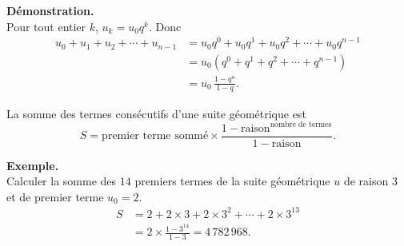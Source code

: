\documentclass[11pt]{article}
\newenvironment{exemple}{\par\smallskip\noindent\textbf{Exemple. \\}\ignorespaces}{\par\smallskip}
\newenvironment{demonstration}{\par\smallskip\noindent\textbf{Démonstration. \\}\ignorespaces}{\par\smallskip}
\begin{document}
\begin{demonstration}
Pour tout entier $k$, $u_k=u_0q^k$. Donc
\begin{align*}
u_0+u_1+u_2+\cdots+u_{n-1}
 &=u_0q^0+u_0q^1+u_0q^2+\cdots+u_0q^{n-1}\\
 &=u_0(q^0+q^1+q^2+\cdots+q^{n-1})\\
 &=u_0\,\frac{1-q^n}{1-q}.
\end{align*}
\end{demonstration}

\begin{theoreme}
La somme des termes consécutifs d'une suite géométrique est
\[
S=\text{premier terme sommé}\times
\frac{1-\text{raison}^{\text{nombre de termes}}}{1-\text{raison}}.
\]
\end{theoreme}

\begin{exemple}
Calculer la somme des $14$ premiers termes de la suite géométrique $u$ de raison $3$ et de premier terme $u_0=2$.
\[
\begin{aligned}
S&=2+2\times3+2\times3^2+\cdots+2\times3^{13}\\
 &=2\times\frac{1-3^{14}}{1-3}=4\,782\,968.
\end{aligned}
\]
\end{exemple}
\end{document}
